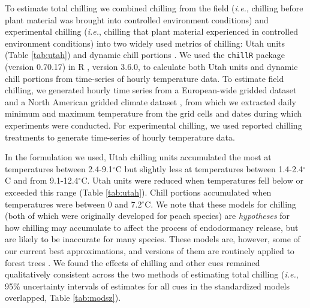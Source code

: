 \documentclass{article}
\begin{document}
\par To estimate total chilling we combined chilling from the field (\emph{i.e.}, chilling before plant material was brought into controlled environment conditions) and experimental chilling (\emph{i.e.}, chilling that plant material experienced in controlled environment conditions) into two widely used metrics of chilling: Utah units (Table \ref{tab:utah}) and dynamic chill portions \emph{\citep{dennis2003,Luedeling:2011qe}}. We used the \texttt{chillR} package (version 0.70.17) in R \emph{\citep{Rcore:2017, chillR2019}}, version 3.6.0, to calculate both Utah units and dynamic chill portions from time-series of hourly temperature data. To estimate field chilling, we generated hourly time series from a European-wide gridded dataset \emph{\citep{cornes2018}} and a North American gridded climate dataset \emph{\citep{livneh2015}}, from which we extracted daily minimum and maximum temperature from the grid cells and dates during which experiments were conducted. For experimental chilling, we used reported chilling treatments to generate time-series of hourly temperature data.
\par In the formulation we used, Utah chilling units accumulated the most at temperatures between 2.4-9.1$^{\circ}$C but slightly less at temperatures between 1.4-2.4$^{\circ}$C and from 9.1-12.4$^{\circ}$C. Utah units were reduced when temperatures fell below or exceeded this range (Table \ref{tab:utah}). Chill portions accumulated when temperatures were between 0 and 7.2$^{\circ}$C. We note that these models for chilling (both of which were originally developed for peach species) are \emph{hypotheses} for how chilling may accumulate to affect the process of endodormancy release, but are likely to be inaccurate for many species. These models are, however, some of our current best approximations, and versions of them are routinely applied to forest trees \emph{\citep[e.g.,][]{Harrington:2010}}. We found the effects of chilling and other cues remained qualitatively consistent across the two methods of estimating total chilling (\emph{i.e.}, 95\% uncertainty intervals of estimates for all cues in the standardized models overlapped, Table \ref{tab:modsz}).
\end{document}

